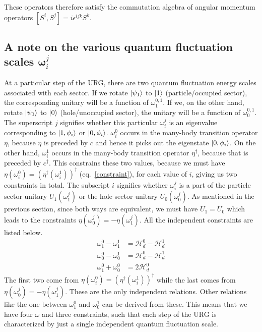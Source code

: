 These operators therefore satisfy the commutation algebra of angular momentum operators \(\left[S^i, S^j\right] = i\epsilon^{ijk}S^k\).

\subsection{A note on the various quantum fluctuation scales \(\pmb\omega_i^j\)}
At a particular step of the URG, there are two quantum fluctuation energy scales associated with each sector. If we rotate \(\ket{\psi_1}\) to \(\ket{1}\) (particle/occupied sector), the corresponding unitary will be a function of \(\omega_1^{0,1}\). If we, on the other hand, rotate \(\ket{\psi_0}\) to \(\ket{0}\) (hole/unoccupied sector), the unitary will be a function of \(\omega_0^{0,1}\). The superscript \(j\) signifies whether this particular \(\omega_i^j\) is an eigenvalue corresponding to \(\ket{1,\phi_i}\) or \(\ket{0,\phi_i}\). \(\omega^0_i\) occurs in the many-body transition operator \(\eta\), because \(\eta\) is preceded by \(c\) and hence it picks out the eigenstate \(\ket{0,\phi_i}\). On the other hand, \(\omega^1_i\) occurs in the many-body transition operator \(\eta^\dagger\), because that is preceded by \(c^\dagger\). This constrains these two values, because we must have \(\eta(\omega_i^0) = \left(\eta^\dagger(\omega_i^1)\right)^\dagger\) (eq.~\ref{constraint}), for each value of \(i\), giving us two constraints in total. The subscript \(i\) signifies whether \(\omega_i^j\) is a part of the particle sector unitary \(U_1(\omega_1^j)\) or the hole sector unitary \(U_0(\omega_0^j)\). As mentioned in the previous section, since both ways are equivalent, we must have \(U_1 = U_0\) which leads to the constraints \(\eta(\omega_0^j) = -\eta(\omega_1^j)\). All the independent constraints are listed below.
\begin{equation}\begin{aligned}
	\label{omegarel}
\omega_1^0 - \omega_1^1 &=\mathcal{H}_d^0 - \mathcal{H}_d^1\\
\omega_0^0 - \omega_0^1 &= \mathcal{H}_d^0 - \mathcal{H}_d^1\\
\omega_1^0 + \omega_0^0 &= 2\mathcal{H}_d^0
\end{aligned}\end{equation}
The first two come from \(\eta(\omega_i^0) = \left(\eta^\dagger(\omega_i^1)\right)^\dagger\) while the last comes from \(\eta(\omega_0^j) = -\eta(\omega_1^j)\). These are the only independent relations. Other relations like the one between \(\omega_1^0\) and \(\omega_0^1\) can be derived from these. This means that we have four \(\omega\) and three constraints, such that each step of the URG is characterized by just a single independent quantum fluctuation scale.
